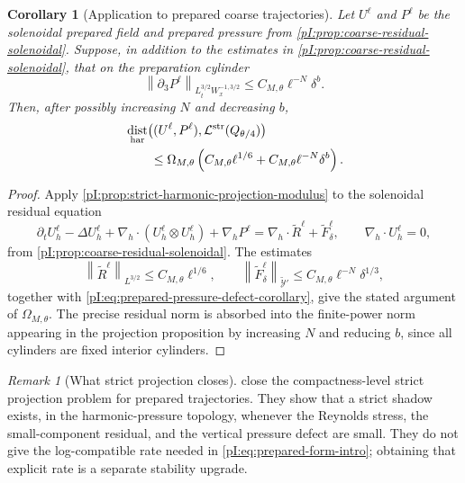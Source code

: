 \documentclass[11pt]{article}
\numberwithin{equation}{section}
\theoremstyle{plain}
\newtheorem{corollary}{Corollary}[section]
\theoremstyle{definition}
\theoremstyle{remark}
\newtheorem{remark}{Remark}[section]
\DeclareMathOperator{\dist}{dist}
\newcommand{\nabh}{\nabla_h}
\newcommand{\divh}{\nabla_h\!\cdot}
\newcommand{\norm}[2]{\left\|#1\right\|_{#2}}
\newcommand{\calL}{\mathcal L}
\begin{document}
\begin{corollary}[Application to prepared coarse trajectories]
\label{pI:cor:prepared-strict-projection-modulus}
Let \(U^\ell\) and \(P^\ell\) be the solenoidal prepared field and prepared pressure from \cref{pI:prop:coarse-residual-solenoidal}.  Suppose, in addition to the estimates in \cref{pI:prop:coarse-residual-solenoidal}, that on the preparation cylinder
\begin{equation}\label{pI:eq:prepared-pressure-defect-corollary}
        \norm{\partial_3P^\ell}{L^{3/2}_tW^{-1,3/2}_x}
        \le C_{M,\theta}\ell^{-N}\delta^b .
\end{equation}
Then, after possibly increasing \(N\) and decreasing \(b\),
\begin{equation}\label{pI:eq:prepared-modulus-projection}
\begin{aligned}
&\dist_{\rm har}
\bigl((U^\ell,P^\ell),\calL^{\rm str}(Q_{\theta/4})\bigr)
\\
&\qquad\le
\Omega_{M,\theta}
\left(
C_{M,\theta}\ell^{1/6}
+
C_{M,\theta}\ell^{-N}\delta^b
\right).
\end{aligned}
\end{equation}
\end{corollary}

\begin{proof}
Apply \cref{pI:prop:strict-harmonic-projection-modulus} to the solenoidal residual equation
\[
        \partial_tU_h^\ell-\Delta U_h^\ell
        +\divh(U_h^\ell\otimes U_h^\ell)
        +\nabh P^\ell
        =\divh \widetilde R^\ell+\widetilde F_\delta^\ell,
        \qquad
        \divh U_h^\ell=0,
\]
from \cref{pI:prop:coarse-residual-solenoidal}.  The estimates
\[
        \norm{\widetilde R^\ell}{L^{3/2}}
        \le C_{M,\theta}\ell^{1/6},
        \qquad
        \norm{\widetilde F_\delta^\ell}{\widetilde{\mathcal Y}'}
        \le C_{M,\theta}\ell^{-N}\delta^{1/3},
\]
together with \eqref{pI:eq:prepared-pressure-defect-corollary}, give the stated argument of \(\Omega_{M,\theta}\).  The precise residual norm is absorbed into the finite-power norm appearing in the projection proposition by increasing \(N\) and reducing \(b\), since all cylinders are fixed interior cylinders.
\end{proof}

\begin{remark}[What strict projection closes]
 close the compactness-level strict projection problem for prepared trajectories.  They show that a strict shadow exists, in the harmonic-pressure topology, whenever the Reynolds stress, the small-component residual, and the vertical pressure defect are small.  They do not give the log-compatible rate needed in \eqref{pI:eq:prepared-form-intro}; obtaining that explicit rate is a separate stability upgrade.
\end{remark}
\end{document}
